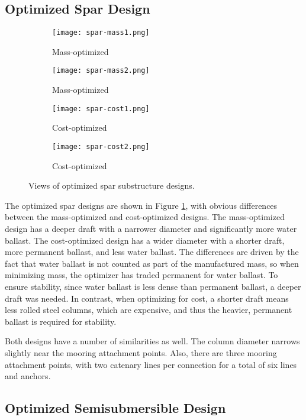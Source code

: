 \subsection{Optimized Spar Design}

\begin{figure}[htb]
  \begin{subfigure}[b]{0.24\linewidth}
    \centering \texttt{[image: spar-mass1.png]}
    \caption{Mass-optimized}
  \end{subfigure}
  \begin{subfigure}[b]{0.24\linewidth}
    \centering \texttt{[image: spar-mass2.png]}
    \caption{Mass-optimized}
  \end{subfigure}
  \begin{subfigure}[b]{0.24\linewidth}
    \centering \texttt{[image: spar-cost1.png]}
    \caption{Cost-optimized}
  \end{subfigure}
  \begin{subfigure}[b]{0.24\linewidth}
    \centering \texttt{[image: spar-cost2.png]}
    \caption{Cost-optimized}
  \end{subfigure}
  \caption{Views of optimized spar substructure designs.}
  \label{fig:spar-design}
\end{figure}

The optimized spar designs are shown in Figure \ref{fig:spar-design},
with obvious differences between the mass-optimized and cost-optimized
designs.  The mass-optimized design has a deeper draft with a narrower
diameter and significantly more water ballast.  The cost-optimized
design has a wider diameter with a shorter draft, more permanent
ballast, and less water ballast.  The differences are driven by the fact
that water ballast is not counted as part of the manufactured mass, so
when minimizing mass, the optimizer has traded permanent for water
ballast.  To ensure stability, since water ballast is less dense than
permanent ballast, a deeper draft was needed.  In contrast, when
optimizing for cost, a shorter draft means less rolled steel
columns, which are expensive, and thus the heavier, permanent ballast is
required for stability.

Both designs have a number of similarities as well.  The column diameter
narrows slightly near the mooring attachment points.  Also, there are
three mooring attachment points, with two catenary lines per connection
for a total of six lines and anchors.

\subsection{Optimized Semisubmersible Design}

